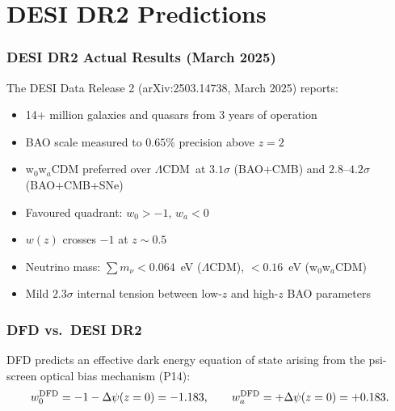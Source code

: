 \documentclass[11pt,a4paper]{article}
\newcommand{\LCDM}{$\Lambda$CDM}
\begin{document}
\part{DESI DR2 Predictions}
\label{part:DESI}

\section{DESI DR2 Actual Results (March 2025)}
\label{sec:DESI-results}

The DESI Data Release 2 (arXiv:2503.14738, March 2025) reports:
\begin{itemize}[nosep]
\item 14+ million galaxies and quasars from 3 years of operation
\item BAO scale measured to $0.65\%$ precision above $z = 2$
\item w$_0$w$_a$CDM preferred over \LCDM\ at $3.1\sigma$ (BAO+CMB)
  and $2.8$--$4.2\sigma$ (BAO+CMB+SNe)
\item Favoured quadrant: $w_0 > -1$, $w_a < 0$
\item $w(z)$ crosses $-1$ at $z \sim 0.5$
\item Neutrino mass: $\sum m_\nu < 0.064$~eV (\LCDM),
  $< 0.16$~eV (w$_0$w$_a$CDM)
\item Mild $2.3\sigma$ internal tension between low-$z$ and high-$z$
  BAO parameters
\end{itemize}


\section{DFD vs.\ DESI DR2}
\label{sec:DFD-vs-DESI}

DFD predicts an effective dark energy equation of state arising from
the psi-screen optical bias mechanism (P14):
\begin{equation}
w_0^{\rm DFD} = -1 - \Delta\psi(z=0) = -1.183,
\qquad w_a^{\rm DFD} = +\Delta\psi(z=0) = +0.183.
\label{eq:DFD-DE}
\end{equation}
\end{document}
